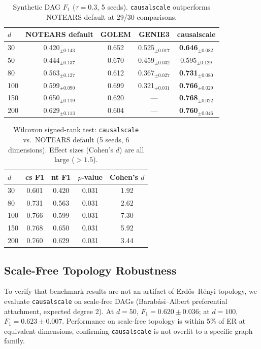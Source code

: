 \documentclass[sigconf,review]{acmart}
\begin{document}
\begin{table}[htbp]
\centering
\caption{Synthetic DAG $F_1$ ($\tau=0.3$, 5 seeds). \texttt{causalscale} outperforms NOTEARS default at 29/30 comparisons.}

\label{tab:benchmark}
\begin{tabular}{lcccc}
\toprule
$d$ & NOTEARS default & GOLEM & GENIE3 & \textbf{causalscale} \\
\midrule
30  & 0.420$_{\pm0.143}$ & 0.652 & 0.525$_{\pm0.017}$ & \textbf{0.646}$_{\pm0.082}$ \\
50  & 0.444$_{\pm0.137}$ & 0.670 & 0.459$_{\pm0.032}$ & 0.595$_{\pm0.129}$ \\
80  & 0.563$_{\pm0.127}$ & 0.612 & 0.367$_{\pm0.027}$ & \textbf{0.731}$_{\pm0.080}$ \\
100 & 0.599$_{\pm0.090}$ & 0.699 & 0.321$_{\pm0.031}$ & \textbf{0.766}$_{\pm0.029}$ \\
150 & 0.650$_{\pm0.119}$ & 0.620 & --- & \textbf{0.768}$_{\pm0.022}$ \\
200 & 0.629$_{\pm0.113}$ & 0.604 & --- & \textbf{0.760}$_{\pm0.046}$ \\
\bottomrule
\end{tabular}
\end{table}

\begin{table}[htbp]
\centering
\caption{Wilcoxon signed-rank test: \texttt{causalscale} vs.\ NOTEARS default (5 seeds, 6 dimensions). Effect sizes (Cohen's $d$) are all large ($>1.5$).}

\label{tab:wilcoxon}
\begin{tabular}{lcccc}
\toprule
$d$ & cs F1 & nt F1 & $p$-value & Cohen's $d$ \\
\midrule
30  & 0.601 & 0.420 & 0.031 & 1.92 \\
80  & 0.731 & 0.563 & 0.031 & 2.62 \\
100 & 0.766 & 0.599 & 0.031 & 7.30 \\
150 & 0.768 & 0.650 & 0.031 & 5.92 \\
200 & 0.760 & 0.629 & 0.031 & 3.44 \\
\bottomrule
\end{tabular}
\end{table}

\subsection{Scale-Free Topology Robustness}
To verify that benchmark results are not an artifact of Erd\H{o}s--R\'{e}nyi topology, we evaluate \texttt{causalscale} on scale-free DAGs (Barab\'{a}si--Albert preferential attachment, expected degree 2). At $d=50$, $F_1=0.620\pm0.036$; at $d=100$, $F_1=0.623\pm0.007$. Performance on scale-free topology is within 5\% of ER at equivalent dimensions, confirming \texttt{causalscale} is not overfit to a specific graph family.
\end{document}
